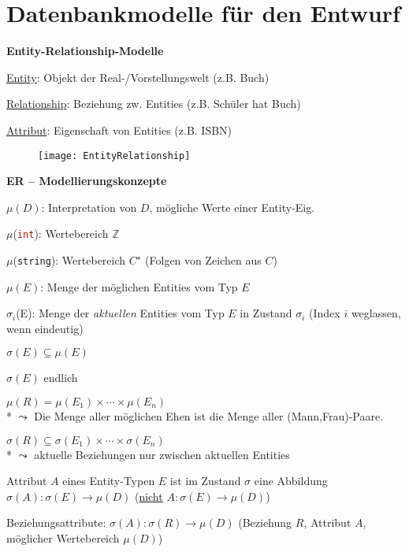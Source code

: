 \section{Datenbankmodelle für den Entwurf}
\label{sec:entwurf}

\textbf{Entity-Relationship-Modelle}
\begin{items}
	\item \underline{Entity}: Objekt der Real-/Vorstellungswelt (z.B. Buch)
	\item \underline{Relationship}: Beziehung zw. Entities (z.B. Schüler hat Buch)
	\item \underline{Attribut}: Eigenschaft von Entities (z.B. ISBN)
\end{items}
\begin{figure}[H]\centering\label{EntityRelationship}\texttt{[image: EntityRelationship]}\end{figure}

\textbf{ER -- Modellierungskonzepte}
\begin{items}
	\item \( \mu(D) \): Interpretation von \( D \), mögliche Werte einer Entity-Eig.
	\item \( \mu \)(\lstinline[language=sql]{int}): Wertebereich \( \mathbb{Z} \)
	\item \( \mu \)(\lstinline[language=sql]{string}): Wertebereich \( C^\star \) (Folgen von Zeichen aus \( C \))
	\item \( \mu(E) \): Menge der möglichen Entities vom Typ \( E \)
	\item \( \sigma_i \)(E): Menge der \emph{aktuellen} Entities vom Typ \( E \) in Zustand \( \sigma_i \) (Index \( i \) weglassen, wenn eindeutig)
	\begin{enumeration}
		\item \( \sigma(E) \subseteq \mu(E) \)
		\item \( \sigma(E) \) endlich
	\end{enumeration}
	\item \( \mu(R) = \mu(E_1) \times \cdots \times \mu(E_n) \) \\* \( \leadsto \) Die Menge aller möglichen Ehen ist die Menge aller (Mann,Frau)-Paare.
	\item \( \sigma(R) \subseteq \sigma(E_1) \times \cdots \times \sigma(E_n) \) \\* \( \leadsto \) aktuelle Beziehungen nur zwischen aktuellen Entities
	\item Attribut \( A \) eines Entity-Typen \( E \) ist im Zustand \( \sigma \) eine Abbildung \( \sigma(A): \sigma(E) \to \mu(D) \) (\underline{nicht} \( A: \sigma(E) \to \mu(D) \))
	\item Beziehungsattribute: \( \sigma(A): \sigma(R) \to \mu(D) \) (Beziehung \( R \), Attribut \( A \), möglicher Wertebereich \( \mu(D) \))
\end{items}

